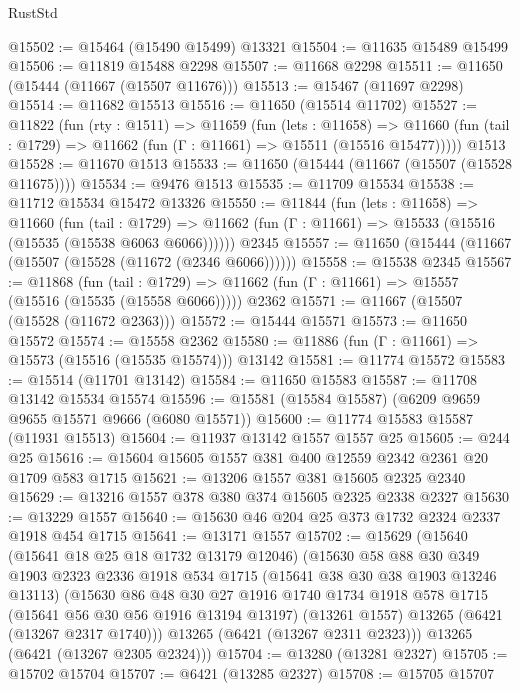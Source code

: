 \begin{lexlean}{RustStd}
\begin{coremodule}
@15502 := @15464 (@15490 @15499) @13321
@15504 := @11635 @15489 @15499
@15506 := @11819 @15488 @2298
@15507 := @11668 @2298
@15511 := @11650 (@15444 (@11667 (@15507 @11676)))
@15513 := @15467 (@11697 @2298)
@15514 := @11682 @15513
@15516 := @11650 (@15514 @11702)
@15527 := @11822
    (fun (rty : @1511) =>
    @11659
      (fun (lets : @11658) =>
      @11660 (fun (tail : @1729) => @11662 (fun (Γ : @11661) => @15511 (@15516 @15477)))))
    @1513
@15528 := @11670 @1513
@15533 := @11650 (@15444 (@11667 (@15507 (@15528 @11675))))
@15534 := @9476 @1513
@15535 := @11709 @15534
@15538 := @11712 @15534 @15472 @13326
@15550 := @11844
    (fun (lets : @11658) =>
    @11660
      (fun (tail : @1729) =>
      @11662 (fun (Γ : @11661) => @15533 (@15516 (@15535 (@15538 @6063 @6066))))))
    @2345
@15557 := @11650 (@15444 (@11667 (@15507 (@15528 (@11672 (@2346 @6066))))))
@15558 := @15538 @2345
@15567 := @11868
    (fun (tail : @1729) => @11662 (fun (Γ : @11661) => @15557 (@15516 (@15535 (@15558 @6066)))))
    @2362
@15571 := @11667 (@15507 (@15528 (@11672 @2363)))
@15572 := @15444 @15571
@15573 := @11650 @15572
@15574 := @15558 @2362
@15580 := @11886 (fun (Γ : @11661) => @15573 (@15516 (@15535 @15574))) @13142
@15581 := @11774 @15572
@15583 := @15514 (@11701 @13142)
@15584 := @11650 @15583
@15587 := @11708 @13142 @15534 @15574
@15596 := @15581 (@15584 @15587) (@6209 @9659 @9655 @15571 @9666 (@6080 @15571))
@15600 := @11774 @15583 @15587 (@11931 @15513)
@15604 := @11937 @13142 @1557 @1557 @25
@15605 := @244 @25
@15616 := @15604 @15605 @1557 @381 @400 @12559 @2342 @2361 @20 @1709 @583 @1715
@15621 := @13206 @1557 @381 @15605 @2325 @2340
@15629 := @13216 @1557 @378 @380 @374 @15605 @2325 @2338 @2327
@15630 := @13229 @1557
@15640 := @15630 @46 @204 @25 @373 @1732 @2324 @2337 @1918 @454 @1715
@15641 := @13171 @1557
@15702 := @15629
    (@15640
      (@15641 @18 @25 @18 @1732 @13179 @12046)
      (@15630
        @58
        @88
        @30
        @349
        @1903
        @2323
        @2336
        @1918
        @534
        @1715
        (@15641 @38 @30 @38 @1903 @13246 @13113)
        (@15630
          @86
          @48
          @30
          @27
          @1916
          @1740
          @1734
          @1918
          @578
          @1715
          (@15641 @56 @30 @56 @1916 @13194 @13197)
          (@13261 @1557)
          @13265
          (@6421 (@13267 @2317 @1740)))
        @13265
        (@6421 (@13267 @2311 @2323)))
      @13265
      (@6421 (@13267 @2305 @2324)))
@15704 := @13280 (@13281 @2327)
@15705 := @15702 @15704
@15707 := @6421 (@13285 @2327)
@15708 := @15705 @15707

\end{coremodule}
\end{lexlean}
